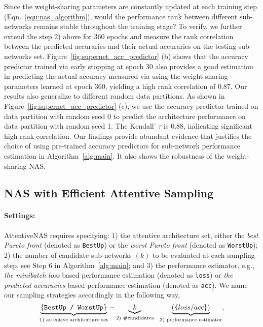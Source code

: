 \documentclass[final]{cvpr}
\theoremstyle{definition}
\begin{document}
Since the weight-sharing parameters are constantly updated at each training step (Eqn.~\eqref{equ:nas_algorithm}), would the performance rank between different sub-networks remains stable throughout the training stage? 
To verify,  we further extend the step 2) above for 360 epochs and measure the 
rank correlation between the predicted accuraries and their actual accuraries on the testing sub-networks set. 
Figure~\ref{fig:supernet_acc_predictor} (b) shows 
that the accuracy predictor trained via early stopping at epoch 30
also provides a good estimation in predicting the actual accuracy measured via using the weight-sharing parameters learned at epoch 360, yielding a high rank correlation of 0.87.  
Our results also generalize to different random data partitions.
As shown in Figure~\ref{fig:supernet_acc_predictor} (c), 
we use the accuracy predictor trained on data partition with random seed 0 to predict the architecture performance on data partition with random seed 1.
The Kendall' $\tau$ is 0.88, indicating significant high rank correlation. 
Our findings provide abundant evidence that justifies the choice of using pre-trained accuracy predictors for sub-network performance estimation in Algorithm~\ref{alg:main}. It also shows the robustness of the weight-sharing NAS.
 
\subsection{NAS with Efficient Attentive Sampling}
\label{sec:attentive_nas}

\paragraph{Settings:}
AttentiveNAS requires specifying: 
1) the attentive architecture set, either the \emph{best Pareto front} (denoted as \texttt{BestUp}) or the \emph{worst Pareto front} (denoted as \texttt{WorstUp});
2) the number of candidate sub-networks  $(k)$ to be evaluated at each sampling step, see Step 6 in Algorithm~\ref{alg:main}; 
and 3) the performance estimator, e.g., \emph{the minibatch loss} based performance estimation (denoted as \texttt{loss}) or \emph{the predicted accuracies} based performance estimation (denoted as \texttt{acc}).
We name our sampling strategies accordingly in the following way, 
$$
\underbrace{\{\texttt{BestUp / WorstUp}\}}_\text{1) attentive architecture  set}-\underbrace{k}_\text{2) \#candidates}~~\underbrace{(\texttt\{loss/acc\})}_\text{3) performance estimator}, 
$$
\end{document}
